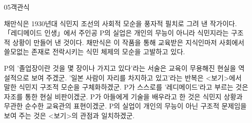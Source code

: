\documentclass[fs85,seriesWit]{korfarm-base}
\begin{document}
\begin{kfQBlock}{05}{객관식}
\begin{kfEvidence}채만식은 1930년대 식민지 조선의 사회적 모순을 풍자적 필치로 그려 낸 작가이다. 「레디메이드 인생」에서 주인공 P의 실업은 개인의 무능이 아니라 식민지라는 구조적 상황이 만들어 낸 것이다. 채만식은 이 작품을 통해 교육받은 지식인마저 사회에서 쓸모없는 존재로 전락시키는 식민 체제의 모순을 고발하고 있다.\end{kfEvidence}
\begin{kfChoices}
\kfChoice P의 '졸업장이란 것을 몇 장이나 가지고 있다'라는 서술은 교육이 무용해진 현실을 역설적으로 보여 주겠군.
\kfChoice '일본 사람이 자리를 차지하고 있고'라는 반복은 <보기>에서 말한 식민지 구조적 모순을 구체화하겠군.
\kfChoice P가 스스로를 '레디메이드'라고 부르는 것은 자조를 통한 현실 비판이겠군.
\kfChoice P가 아들에게 기술을 배우라고 한 것은 식민지 상황과 무관한 순수한 교육관의 표현이겠군.
\kfChoice P의 실업이 개인의 무능이 아닌 구조적 문제임을 보여 주는 것은 <보기>의 관점과 일치하겠군.
\end{kfChoices}
\end{kfQBlock}

\kfEndMC

\end{document}
